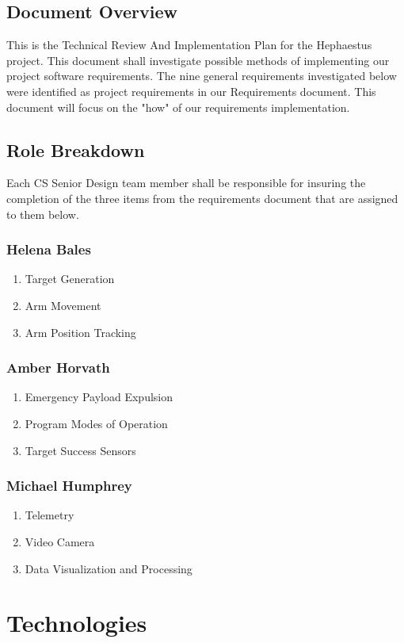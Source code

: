 \documentclass[letterpaper,10pt]{article}
\begin{document}
\subsection{Document Overview}
This is the Technical Review And Implementation Plan for the Hephaestus project.
This document shall investigate possible methods of implementing our project software requirements.
The nine general requirements investigated below were identified as project requirements in our Requirements document.
This document will focus on the "how" of our requirements implementation.
\subsection{Role Breakdown}
Each CS Senior Design team member shall be responsible for insuring the completion of the three items
from the requirements document that are assigned to them below.
\subsubsection{Helena Bales}
\begin{enumerate}
\item{Target Generation}
\item{Arm Movement}
\item{Arm Position Tracking}
\end{enumerate}
\subsubsection{Amber Horvath}
\begin{enumerate}
\item{Emergency Payload Expulsion}
\item{Program Modes of Operation}
\item{Target Success Sensors}
\end{enumerate}
\subsubsection{Michael Humphrey}
\begin{enumerate}
\item{Telemetry}
\item{Video Camera}
\item{Data Visualization and Processing}
\end{enumerate}

\section{Technologies}
\end{document}
